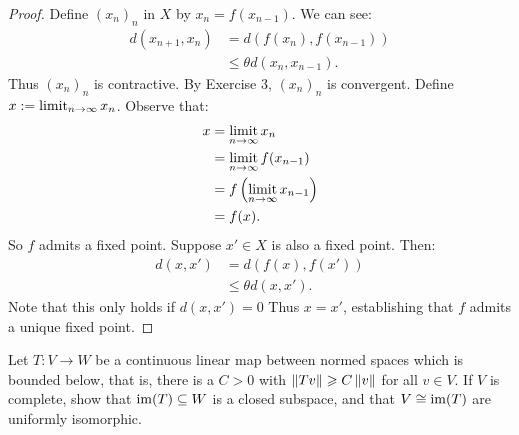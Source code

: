 \documentclass[11pt,twoside,openany]{memoir}
\begin{document}
        \begin{proof}
            Define $(x_n)_n$ in $X$ by $x_n = f(x_{n-1})$. We can see:
                \begin{equation*}
                \begin{split}
                    d(x_{n+1},x_n) 
                    & = d(f(x_n),f(x_{n-1})) \\
                    & \leq \theta d(x_n,x_{n-1}).
                \end{split}
                \end{equation*}
            Thus $(x_n)_n$ is contractive. By Exercise 3, $(x_n)_n$ is convergent. Define $x := \operatorname*{limit}_{n \rightarrow \infty }x_n$. Observe that:
                \begin{equation*}
                \begin{split}
                    x 
                    & = \operatorname*{limit}_{n \rightarrow \infty}x_n \\
                    & = \operatorname*{limit}_{n \rightarrow \infty}f(x_{n-1}) \\
                    & = f \left( \operatorname*{limit}_{n \rightarrow \infty}x_{n-1} \right) \\
                    & = f(x).
                \end{split}
                \end{equation*}
            So $f$ admits a fixed point. Suppose $x' \in X$ is also a fixed point. Then:
                \begin{equation*}
                \begin{split}
                    d(x,x')
                    & =d(f(x),f(x')) \\
                    & \leq \theta d(x,x').
                \end{split}
                \end{equation*}
            Note that this only holds if $d(x,x') = 0$ Thus $x=x'$, establishing that $f$ admits a unique fixed point.
        \end{proof}
    \newpage
\addtocounter{exercise}{1}
    \begin{exercise}
        Let $T:V \rightarrow W$ be a continuous linear map between normed spaces which is bounded below, that is, there is a $C>0$ with $\left\lVert Tv \right\rVert \geqslant C \left\lVert v \right\rVert$ for all $v \in V$. If $V$ is complete, show that $\operatorname{im}(T) \subseteq W$ is a closed subspace, and that $V \cong \operatorname{im}(T)$ are uniformly isomorphic.
    \end{exercise}
\end{document}
